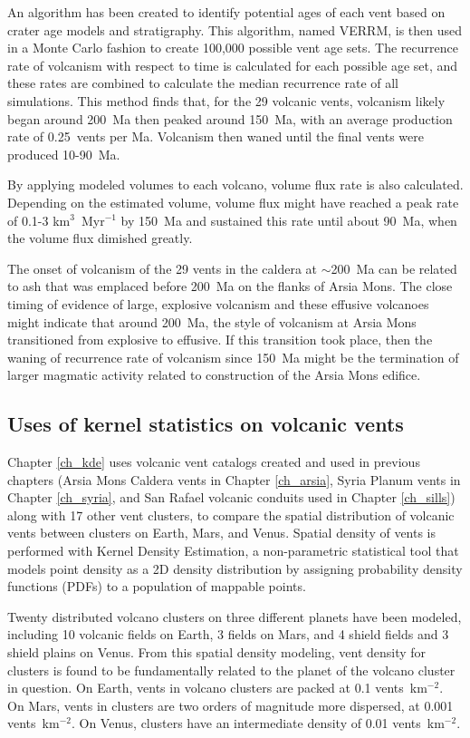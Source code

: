 An algorithm has been created to identify potential ages of each vent based on crater age models and stratigraphy. This algorithm, named VERRM, is then used in a Monte Carlo fashion to create 100,000 possible vent age sets. The recurrence rate of volcanism with respect to time is calculated for each possible age set, and these rates are combined to calculate the median recurrence rate of all simulations. This method finds that, for the 29 volcanic vents, volcanism likely began around 200~Ma then peaked around 150~Ma, with an average production rate of 0.25~vents per Ma. Volcanism then waned until the final vents were produced 10-90~Ma.

By applying modeled volumes to each volcano, volume flux rate is also calculated. Depending on the estimated volume, volume flux might have reached a peak rate of 0.1-3 km$^3$~Myr$^{-1}$ by 150~Ma and sustained this rate until about 90~Ma, when the volume flux dimished greatly.

The onset of volcanism of the 29 vents in the caldera at $\sim$200~Ma can be related to ash that was emplaced before 200~Ma on the flanks of Arsia Mons. The close timing of evidence of large, explosive volcanism and these effusive volcanoes might indicate that around 200~Ma, the style of volcanism at Arsia Mons transitioned from explosive to effusive. If this transition took place, then the waning of recurrence rate of volcanism since 150~Ma might be the termination of larger magmatic activity related to construction of the Arsia Mons edifice.


\subsection{Uses of kernel statistics on volcanic vents}
Chapter \ref{ch_kde} uses volcanic vent catalogs created and used in previous chapters (Arsia Mons Caldera vents in Chapter \ref{ch_arsia}, Syria Planum vents in Chapter \ref{ch_syria}, and San Rafael volcanic conduits used in Chapter \ref{ch_sills}) along with 17 other vent clusters, to compare the spatial distribution of volcanic vents between clusters on Earth, Mars, and Venus. Spatial density of vents is performed with Kernel Density Estimation, a non-parametric statistical tool that models point density as a 2D density distribution by assigning probability density functions (PDFs) to a population of mappable points. 

Twenty distributed volcano clusters on three different planets have been modeled, including 10 volcanic fields on Earth, 3 fields on Mars, and 4 shield fields and 3 shield plains on Venus. From this spatial density modeling, vent density for clusters is found to be fundamentally related to the planet of the volcano cluster in question. On Earth, vents in volcano clusters are packed at 0.1 vents~km$^{-2}$. On Mars, vents in clusters are two orders of magnitude more dispersed, at 0.001 vents~km$^{-2}$. On Venus, clusters have an intermediate density of 0.01 vents~km$^{-2}$. 

